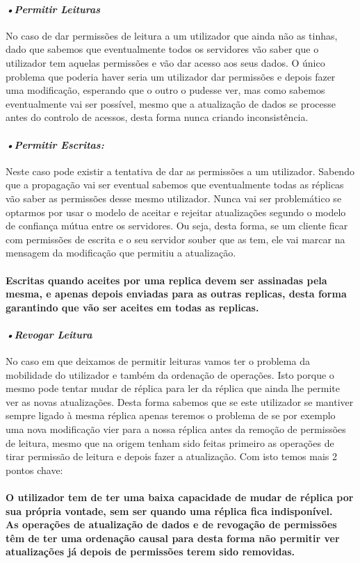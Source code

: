 \documentclass[runningheads,a4paper]{llncs}
\begin{document}
\paragraph{\textbf{\textit{•Permitir Leituras}}}

No caso de dar permissões de leitura a um utilizador que ainda não as tinhas, dado que sabemos que eventualmente todos os servidores vão saber que o utilizador tem aquelas permissões e vão dar acesso aos seus dados. O único problema que poderia haver seria um utilizador dar permissões e depois fazer uma modificação, esperando que o outro o pudesse ver, mas como sabemos eventualmente vai ser possível, mesmo que a atualização de dados se processe antes do controlo de acessos, desta forma nunca criando inconsistência.

\paragraph{\textbf{\textit{•Permitir Escritas: }}}
Neste caso pode existir a tentativa de dar as permissões a um utilizador. Sabendo que a propagação vai ser eventual sabemos que eventualmente todas as réplicas vão saber as permissões desse mesmo utilizador. Nunca vai ser problemático se optarmos por usar o modelo de aceitar e rejeitar atualizações segundo o modelo de confiança mútua entre os servidores. Ou seja, desta forma, se um cliente ficar com permissões de escrita e o seu servidor souber que as tem, ele vai marcar na mensagem da modificação que permitiu a atualização.
\\
\\
\textbf{Escritas quando aceites por uma replica devem ser assinadas pela mesma, e apenas depois enviadas para as outras replicas, desta forma garantindo que vão ser aceites em todas as replicas.}


\paragraph{\textbf{\textit{•Revogar Leitura}}}

No caso em que deixamos de permitir leituras vamos ter o problema da mobilidade do utilizador e também da ordenação de operações. Isto porque o mesmo pode tentar mudar de réplica para ler da réplica que ainda lhe permite ver as novas atualizações. Desta forma sabemos que se este utilizador se mantiver sempre ligado à mesma réplica apenas teremos o problema de se por exemplo uma nova modificação vier para a nossa réplica antes da remoção de permissões de leitura, mesmo que na origem tenham sido feitas primeiro as operações de tirar permissão de leitura e depois fazer a atualização. Com isto temos mais 2 pontos chave:
\\
\\
\textbf{O utilizador tem de ter uma baixa capacidade de mudar de réplica por sua própria vontade, sem ser quando uma réplica fica indisponível.}
\\
\textbf{As operações de atualização de dados e de revogação de permissões têm de ter uma ordenação causal para desta forma não permitir ver atualizações já depois de permissões terem sido removidas.
}
\end{document}
